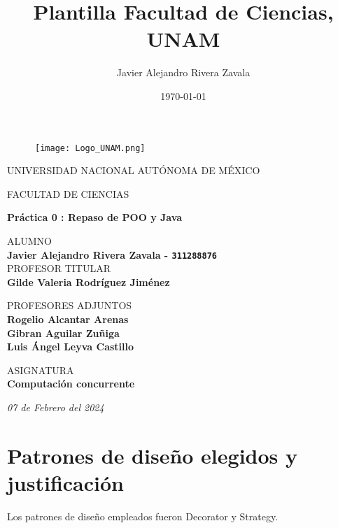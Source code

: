 \documentclass{article}
\title{Plantilla Facultad de Ciencias, UNAM}
\author{Javier Alejandro Rivera Zavala}
\date{\today}
\begin{document}
\thispagestyle{empty}
	
	\begin{figure}[ht]
	  	\begin{center}
        \texttt{[image: Logo\_UNAM.png]}
		\label{EscudoUNAM}
        \end{center}	     
	\end{figure}
	
	\begin{center}
	\vspace{0.8cm}
	\LARGE
	UNIVERSIDAD NACIONAL AUTÓNOMA DE MÉXICO 
	
	\vspace{0.7cm}
	\LARGE
	FACULTAD DE CIENCIAS
	
	\vspace{0.8 cm}	
	\Large
	\textbf{Práctica 0 : Repaso de POO y Java}

	\vspace{0.8 cm}
	\normalsize	
	ALUMNO\\
	\vspace{.2cm}
	\large   
    \textbf{Javier Alejandro Rivera Zavala  - \texttt{311288876}}\\   
	\vspace{1 cm}
	\normalsize	
	PROFESOR TITULAR\\
	\vspace{.2cm}
	\large
	\textbf{Gilde Valeria Rodríguez Jiménez}
	
	\vspace{1 cm}
	PROFESORES ADJUNTOS \\
	\vspace{.2cm}
	\large
	\textbf{Rogelio Alcantar Arenas}\\	
    \textbf{Gibran Aguilar Zuñiga}\\	
    \textbf{Luis Ángel Leyva Castillo}\\	
	\vspace{1.3cm}
	
	\normalsize	
	ASIGNATURA \\
	\vspace{.2cm}
	\large
	\textbf{Computación concurrente}
	
	\vspace{1 cm}
	\textit{07 de Febrero del 2024}
	\end{center}
        \newpage
        
\section*{Patrones de diseño elegidos y justificación}
Los patrones de diseño empleados fueron Decorator y Strategy.\\
\end{document}
